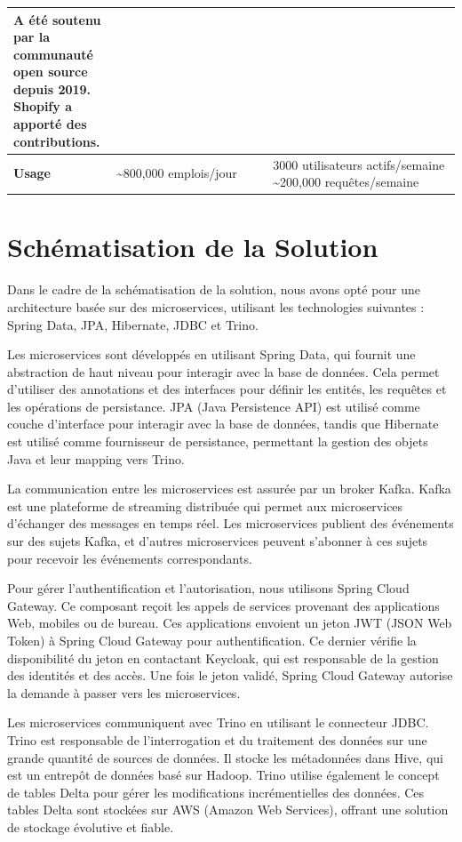 \begin{longtable}{|p{0.23\linewidth}|p{0.35\linewidth}|p{0.42\linewidth}|}
A été soutenu par la communauté open source depuis 2019. Shopify a apporté des contributions. \\ \hline
\textbf{Usage} & 
\textasciitilde800,000 emplois/jour & 
3000 utilisateurs actifs/semaine \newline
\textasciitilde200,000 requêtes/semaine \\ \hline
\end{longtable}

\section{Schématisation de la Solution}

Dans le cadre de la schématisation de la solution, nous avons opté pour une architecture basée sur des microservices, utilisant les technologies suivantes : Spring Data, JPA, Hibernate, JDBC et Trino.

Les microservices sont développés en utilisant Spring Data, qui fournit une abstraction de haut niveau pour interagir avec la base de données. Cela permet d'utiliser des annotations et des interfaces pour définir les entités, les requêtes et les opérations de persistance. JPA (Java Persistence API) est utilisé comme couche d'interface pour interagir avec la base de données, tandis que Hibernate est utilisé comme fournisseur de persistance, permettant la gestion des objets Java et leur mapping vers Trino.

La communication entre les microservices est assurée par un broker Kafka. Kafka est une plateforme de streaming distribuée qui permet aux microservices d'échanger des messages en temps réel. Les microservices publient des événements sur des sujets Kafka, et d'autres microservices peuvent s'abonner à ces sujets pour recevoir les événements correspondants.

Pour gérer l'authentification et l'autorisation, nous utilisons Spring Cloud Gateway. Ce composant reçoit les appels de services provenant des applications Web, mobiles ou de bureau. Ces applications envoient un jeton JWT (JSON Web Token) à Spring Cloud Gateway pour authentification. Ce dernier vérifie la disponibilité du jeton en contactant Keycloak, qui est responsable de la gestion des identités et des accès. Une fois le jeton validé, Spring Cloud Gateway autorise la demande à passer vers les microservices.

Les microservices communiquent avec Trino en utilisant le connecteur JDBC\@. Trino est responsable de l'interrogation et du traitement des données sur une grande quantité de sources de données. Il stocke les métadonnées dans Hive, qui est un entrepôt de données basé sur Hadoop. Trino utilise également le concept de tables Delta pour gérer les modifications incrémentielles des données. Ces tables Delta sont stockées sur AWS (Amazon Web Services), offrant une solution de stockage évolutive et fiable.

